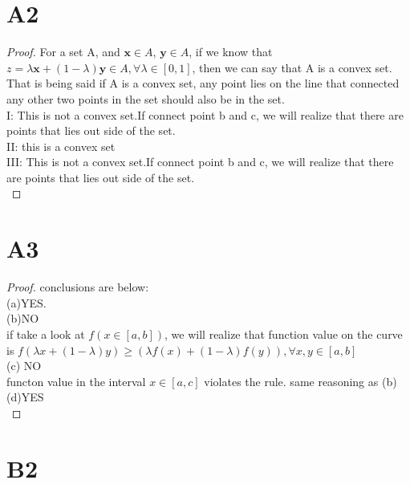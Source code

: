 \documentclass[12pt]{article}
\begin{document}
\section*{A2}
\begin{proof}
        
For a set A, and $\mathbf{x} \in A$, $\mathbf{y} \in A$, if we know that $z = \lambda \mathbf{x} + (1- \lambda) \mathbf{y} \in A, \forall \lambda \in [0,1]$, then we can say that A is a convex set. That is being said if A is a convex set, any point lies on the line that connected any other two points in the set should also be in the set.\\
I: This is not a convex set.If connect point b and c, we will realize that there are points that lies out side of the set.\\

\noindent II: this is a convex set\\

\noindent III:  This is not a convex set.If connect point b and c, we will realize that there are points that lies out side of the set. \\


\end{proof}
\newpage
\section*{A3}
\begin{proof}
        conclusions are below: \\

        \noindent (a)YES.\\
         
        \noindent (b)NO\\
        if take a look at $f(x \in [a,b])$, we will realize that function value on the curve is $f(\lambda x + (1-\lambda)y) \geq (\lambda f(x) + (1-\lambda)f(y)), \forall x,y \in [a,b] $\\

        \noindent (c) NO\\
        functon value in the interval $x \in [a,c]$ violates the rule. same reasoning as (b)\\

        \noindent (d)YES \\

\end{proof}

\newpage

\section*{B2}
\end{document}
